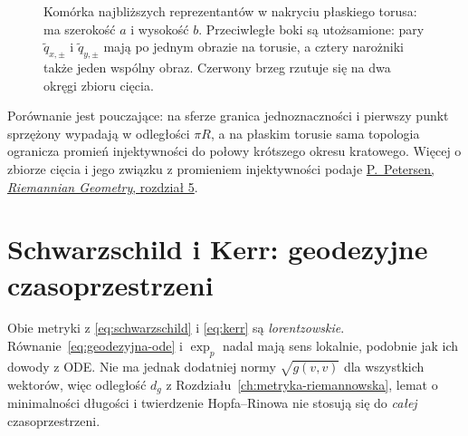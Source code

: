 \begin{figure}[htbp]
\centering
{}
\caption{Komórka najbliższych reprezentantów w nakryciu
płaskiego torusa: ma szerokość $a$ i wysokość $b$.
Przeciwległe boki są utożsamione:
pary $\widetilde q_{x,\pm}$ i $\widetilde q_{y,\pm}$
mają po jednym obrazie na torusie,
a cztery narożniki także jeden wspólny obraz.
Czerwony brzeg rzutuje się na dwa okręgi zbioru cięcia.}
\label{fig:ciecie-torus}
\end{figure}

Porównanie jest pouczające: na sferze granica
jednoznaczności i pierwszy punkt sprzężony wypadają
w odległości $\pi R$, a na płaskim torusie sama
topologia ogranicza promień injektywności
do połowy krótszego okresu kratowego.
Więcej o zbiorze cięcia i jego związku
z promieniem injektywności podaje
\href{https://www.math.ucla.edu/~petersen/RG.pdf}
{P.~Petersen, \emph{Riemannian Geometry}, rozdział 5}.

\section{Schwarzschild i Kerr: geodezyjne czasoprzestrzeni}
\label{sec:geodezyjne-schwarzschild-kerr}

Obie metryki z \eqref{eq:schwarzschild} i
\eqref{eq:kerr} są \emph{lorentzowskie}.
Równanie~\eqref{eq:geodezyjna-ode} i $\exp_p$
nadal mają sens lokalnie, podobnie jak ich
dowody z ODE. Nie ma jednak dodatniej normy
$\sqrt{g(v,v)}$ dla wszystkich wektorów,
więc odległość $d_g$ z Rozdziału~\ref{ch:metryka-riemannowska},
lemat o minimalności długości i twierdzenie
Hopfa--Rinowa nie stosują się do \emph{całej}
czasoprzestrzeni.

